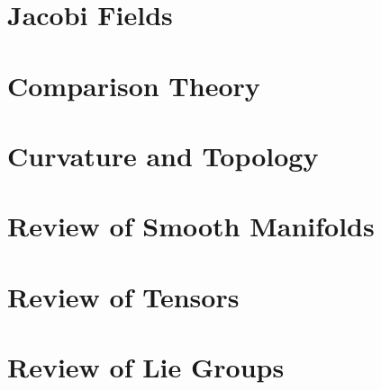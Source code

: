 \chapter{Jacobi Fields}
\label{chap:jacobi-fields}


\chapter{Comparison Theory}
\label{chap:comparison-theory}


\chapter{Curvature and Topology}
\label{chap:curvature-and-topology}


\appendix

\chapter{Review of Smooth Manifolds}
\label{chap:review-smooth-manifolds}


\chapter{Review of Tensors}
\label{chap:review-tensors}


\chapter{Review of Lie Groups}
\label{chap:review-lie-groups}

